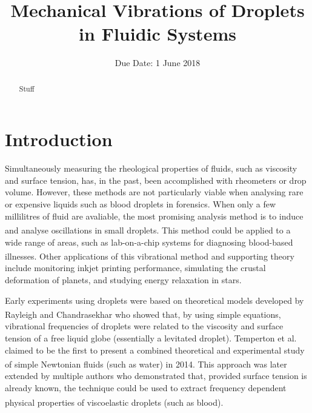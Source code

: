 \documentclass{physics_article_B}
\title{Mechanical Vibrations of Droplets in Fluidic Systems}
\date{Due Date: 1 June 2018}
\begin{document}
	
\setcounter{page}{0}
%

\begin{abstract}
	\large{Stuff 
}
\end{abstract}
	

\tableofcontents

\setcounter{page}{1}
\setlength{\parskip}{6pt}  
\newpage
{} 
\setcounter{page}{1}

\section{Introduction\label{sect:intro}}

Simultaneously measuring the rheological properties of fluids, such as viscosity and surface tension, has, in the past, been accomplished with rheometers or drop volume. However, these methods are not particularly viable when analysing rare or expensive liquids such as blood droplets in forensics. When only a few millilitres of fluid are avaliable, the most promising analysis method is to induce and analyse oscillations in small droplets\textsuperscript{\cite{harrold}}. This method could be applied to a wide range of areas, such as lab-on-a-chip systems for diagnosing blood-based illnesses\textsuperscript{\cite{yager}}. Other applications of this vibrational method and supporting theory include monitoring inkjet printing performance\cite{Martin2008}, simulating the crustal deformation of planets\cite{vukasinovic}, and studying energy relaxation in stars\cite{vukasinovic}.

Early experiments using droplets were based on theoretical models developed by Rayleigh\textsuperscript{\cite{rayleigh}} and Chandrasekhar\textsuperscript{\cite{chandrasekhar2}} who showed that, by using simple equations, vibrational frequencies of droplets were related to the viscosity and surface tension of a free liquid globe (essentially a levitated droplet). Temperton et al. claimed to be the first to present a combined theoretical and experimental study of simple Newtonian fluids (such as water) in 2014\textsuperscript{\cite{temperton}}. This approach was later extended by multiple authors who demonstrated that, provided surface tension is already known, the technique could be used to extract frequency dependent physical properties of viscoelastic droplets (such as blood)\textsuperscript{\cite{egry}}.
\end{document}
